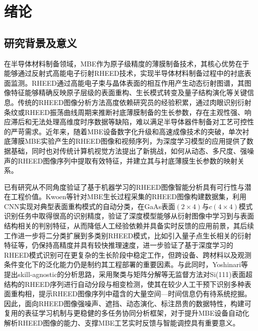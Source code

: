 \clearpage

\section{绪论}

\subsection{研究背景及意义}
在半导体材料制备领域，MBE作为原子级精度的薄膜制备技术，其核心优势在于能够通过反射式高能电子衍射RHEED技术，实现半导体材料制备过程中的衬底表面监测。RHEED通过高能电子束与晶体表面的相互作用产生动态衍射图谱，其图像特征能够精确反映原子层级的表面重构、生长模式转变及量子结构演化等关键信息。传统的RHEED图像分析方法高度依赖研究员的经验积累，通过肉眼识别衍射条纹或RHEED振荡曲线周期来推断衬底薄膜制备的生长参数，存在主观性强、响应滞后和无法处理高维度时序数据等缺陷，难以满足半导体器件制备对工艺可控性的严苛需求。近年来，随着MBE设备数字化升级和高速成像技术的突破，单次衬底薄膜MBE实验产生的RHEED图像和视频序列，为深度学习模型的应用提供了数据基础，同时也对传统计算机视觉方法提出了新挑战，如何从动态、多尺度、强噪声的RHEED图像序列中提取有效特征，并建立其与衬底薄膜生长参数的映射关系。

已有研究从不同角度验证了基于机器学习的RHEED图像智能分析具有可行性与潜在工程价值。Kwoen等针对MBE生长过程采集的RHEED图像构建数据集，利用CNN实现对典型表面重构模式的自动分类，在GaAs表面$(2×4)$与$c(4×4)$模式识别任务中取得很高的识别精度，验证了深度模型能够从衍射图像中学习到与表面结构相关的判别特征，从而降低人工经验依赖并具备实时反馈的应用前景，其后续工作进一步将二分类扩展到多类别RHEED模式，比如引入量子点生长相关的衍射特征等，仍保持高精度并具有较快推理速度，进一步验证了基于深度学习的RHEED模式识别可在更复杂的生长阶段中稳定工作，但跨设备、跨材料以及观测条件变化下的泛化能力仍是制约其工程部署的重要因素。与此同时，Yoshinari等提出skill-agnostic的分析思路，采用聚类与矩阵分解等无监督方法对Si(111)表面超结构的RHEED序列进行自动分段与相变检测，使其在较少人工干预下识别多种表面重构相，提示RHEED图像序列中蕴含的大量空间—时间信息仍有待系统挖掘。因此，面向RHEED图像强噪声、遮挡、动态演化、标注昂贵的数据特性，构建可复用的表征学习机制与更稳健的多任务协同分析框架，对于提升MBE设备自动化解析RHEED图像的能力、支撑MBE工艺实时反馈与智能调控具有重要意义。

